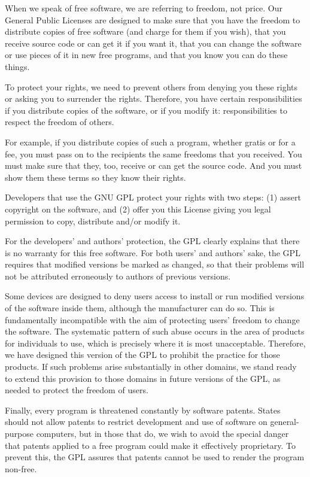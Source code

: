 \documentclass[11pt]{book}
\begin{document}
    When we speak of free software, we are referring to freedom, not
    price.  Our General Public Licenses are designed to make sure that you
    have the freedom to distribute copies of free software (and charge for
    them if you wish), that you receive source code or can get it if you
    want it, that you can change the software or use pieces of it in new
    free programs, and that you know you can do these things.

    To protect your rights, we need to prevent others from denying you
    these rights or asking you to surrender the rights.  Therefore, you have
    certain responsibilities if you distribute copies of the software, or if
    you modify it: responsibilities to respect the freedom of others.

    For example, if you distribute copies of such a program, whether
    gratis or for a fee, you must pass on to the recipients the same
    freedoms that you received.  You must make sure that they, too, receive
    or can get the source code.  And you must show them these terms so they
    know their rights.

    Developers that use the GNU GPL protect your rights with two steps:
    (1) assert copyright on the software, and (2) offer you this License
    giving you legal permission to copy, distribute and/or modify it.

    For the developers' and authors' protection, the GPL clearly explains
    that there is no warranty for this free software.  For both users' and
    authors' sake, the GPL requires that modified versions be marked as
    changed, so that their problems will not be attributed erroneously to
    authors of previous versions.

    Some devices are designed to deny users access to install or run
    modified versions of the software inside them, although the manufacturer
    can do so.  This is fundamentally incompatible with the aim of
    protecting users' freedom to change the software.  The systematic
    pattern of such abuse occurs in the area of products for individuals to
    use, which is precisely where it is most unacceptable.  Therefore, we
    have designed this version of the GPL to prohibit the practice for those
    products.  If such problems arise substantially in other domains, we
    stand ready to extend this provision to those domains in future versions
    of the GPL, as needed to protect the freedom of users.

    Finally, every program is threatened constantly by software patents.
    States should not allow patents to restrict development and use of
    software on general-purpose computers, but in those that do, we wish to
    avoid the special danger that patents applied to a free program could
    make it effectively proprietary.  To prevent this, the GPL assures that
    patents cannot be used to render the program non-free.
\end{document}
